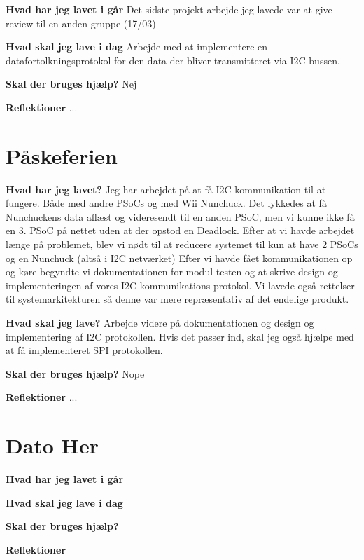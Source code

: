 \documentclass{article}
\begin{document}
	\textbf{Hvad har jeg lavet i går}
	Det sidste projekt arbejde jeg lavede var at give review til en anden gruppe (17/03)
	
	\textbf{Hvad skal jeg lave i dag}
	Arbejde med at implementere en datafortolkningsprotokol for den data der bliver transmitteret via I2C bussen.
	
	\textbf{Skal der bruges hjælp?}
	Nej
	
	\textbf{Reflektioner}
	...
	
	\section{Påskeferien}
	
	\textbf{Hvad har jeg lavet?}
	Jeg har arbejdet på at få I2C kommunikation til at fungere. Både med andre PSoCs og med Wii Nunchuck. Det lykkedes at få Nunchuckens data aflæst og videresendt til en anden PSoC, men vi kunne ikke få en  3. PSoC på nettet uden at der opstod en Deadlock. Efter at vi havde arbejdet længe på problemet, blev vi nødt til at reducere systemet til kun at have 2 PSoCs og en Nunchuck (altså i I2C netværket) Efter vi havde fået kommunikationen op og køre begyndte vi dokumentationen for modul testen og at skrive design og implementeringen af vores I2C kommunikations protokol. Vi lavede også rettelser til systemarkitekturen så denne var mere repræsentativ af det endelige produkt.
	
	\textbf{Hvad skal jeg lave?}
	Arbejde videre på dokumentationen og design og implementering af I2C protokollen. Hvis det passer ind, skal jeg også hjælpe med at få implementeret SPI protokollen.
	
	\textbf{Skal der bruges hjælp?}
	Nope
	
	\textbf{Reflektioner}
	...
	
	\section{Dato Her}
	
	\textbf{Hvad har jeg lavet i går}
	
	\textbf{Hvad skal jeg lave i dag}
	
	\textbf{Skal der bruges hjælp?}
	
	\textbf{Reflektioner}
	
	
\end{document}
